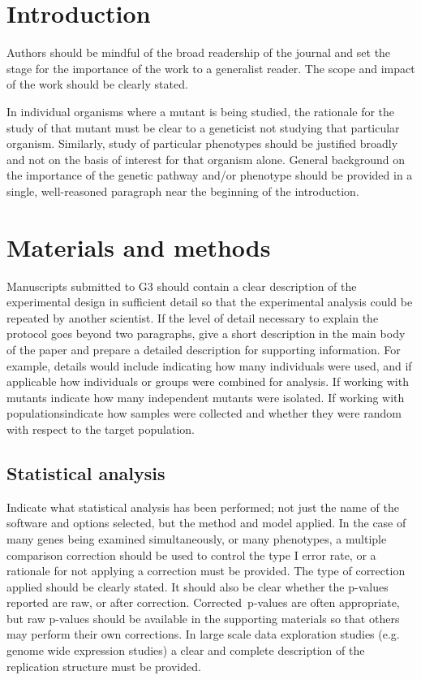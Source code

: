 \documentclass[9pt,twocolumn,twoside,lineno]{gsag3jnl}
\begin{document}
\section{Introduction}

Authors should be mindful of the broad readership of the journal and set the stage for the importance of the work to a generalist reader. The scope and impact of the work should be clearly stated.

In individual organisms where a mutant is being studied, the rationale for the study of that mutant must be clear to a geneticist not studying that particular organism. Similarly, study of particular phenotypes should be justified broadly and not on the basis of interest for that organism alone. General background on the importance of the genetic pathway and/or phenotype should be provided in a single, well-reasoned paragraph near the beginning of the introduction.


\section{Materials and methods}
\label{sec:materials:methods}

Manuscripts submitted to G3 should contain a clear description of the experimental design in sufficient detail so that the experimental analysis could be repeated by another scientist. If the level of detail necessary to explain the protocol goes beyond two paragraphs, give a short description in the main body of the paper and prepare a detailed description for supporting information.  For example, details would include indicating how many individuals were used, and if applicable how individuals or groups were combined for analysis. If working with mutants indicate how many independent mutants were isolated. If working with populations\firstpagebreak indicate how samples were collected and whether they were random with respect to the target population.

\subsection{Statistical analysis}

Indicate what statistical analysis has been performed; not just the name of the software and options selected, but the method and model applied. In the case of many genes being examined simultaneously, or many phenotypes, a multiple comparison correction should be used to control the type I error rate, or a rationale for not applying a correction must be provided. The type of correction applied should be clearly stated. It should also be clear whether the p-values reported are raw, or after correction. Corrected~p-values are often appropriate, but raw p-values should be available in the supporting materials so that others may perform their own corrections. In large scale data exploration studies (e.g. genome wide expression studies) a clear and complete description of the replication structure must be provided.
\end{document}
